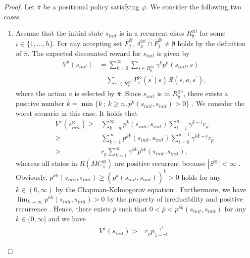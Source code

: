 \documentclass[letterpaper, 10 pt, conference]{ieeeconf}  %
\begin{document}
\begin{proof}
  Let $\bar{\pi}$ be a positional policy satisfying $\varphi$. We consider the following two cases.
  \begin{enumerate}
    \vspace{2mm}
    \item Assume that the initial state $s_{init}$ is in a recurrent class $R^{\otimes i}_{\bar{\pi}}$ for some $ i \in \{1,\ldots,h\} $.
    For any accepting set $\bar{F}^{\otimes}_j$, $\delta^{\otimes i}_{\bar{\pi}} \cap \bar{F}^{\otimes}_j \neq \emptyset$ holds by the definition of $\bar{\pi}$. The expected discounted reward for $s_{init}$ is given by
    \begin{align}
      V^{\bar{\pi}}(s_{init})
       &= \sum_{k=0}^{\infty} \sum_{s \in R^{\otimes i}_{\bar{\pi}}} \gamma^k p^k(s_{init}, s) \nonumber \\
       & \quad \sum_{s^{\prime} \in R^{\otimes i}_{\bar{\pi}}}  P^{\otimes}_{\bar{\pi}}(s^{\prime}\ |\ s) \mathcal{R}(s, a, s^{\prime}), \nonumber
    \end{align}
    where the action $a$ is selected by $\bar{\pi}$. Since $s_{init}$ is in $R^{\otimes i}_{\bar{\pi}}$, there exists a positive number $\bar{k} = \min \{ k\ ;\ k \geq n, p^{k}(s_{init}, s_{init}) > 0 \}$ \cite{ESS}. We consider the worst scenario in this case. It holds that
    \begin{align}
      V^{\bar{\pi}}(s^{\otimes}_{init})
       \geq & \sum_{k=n}^{\infty} p^{k}(s_{init}, s_{init}) \sum_{i=1}^{n} \gamma^{k-i} r_p \nonumber \\
       \geq & \sum_{k=1}^{\infty} p^{k \bar{k}}(s_{init}, s_{init}) \sum_{i=0}^{n-1} \gamma^{k \bar{k} - i} r_p \nonumber \\
       > & r_p \sum_{k=1}^{\infty} \gamma^{k \bar{k}} p^{k \bar{k}}(s_{init}, s_{init}), \nonumber
    \end{align}
whereas all states in $R(MC^{\otimes}_{\bar{\pi}})$ are positive recurrent because $|S^{\otimes}| < \infty$ \cite{ISP}. Obviously, $p^{k \bar{k}}(s_{init}, s_{init}) \geq (p^{\bar{k}}(s_{init}, s_{init}))^k > 0$ holds for any $k \in (0, \infty)$ by the Chapman-Kolmogorov equation \cite{ESS}. Furthermore, we have $\lim_{k \rightarrow \infty} p^{k \bar{k}}(s_{init}, s_{init}) > 0$ by the property of irreducibility and positive recurrence \cite{SM}. Hence, there exists $\bar{p}$ such that $0<\bar{p}<p^{k \bar{k}}(s_{init}, s_{init})$ for any $k \in (0, \infty]$ and we have
    \begin{align}
       V^{\bar{\pi}}(s_{init}) > & r_p \bar{p} \frac{\gamma^{\bar{k}}}{ 1 - \gamma^{\bar{k}} }. \nonumber
    \end{align}


\end{enumerate}
\end{proof}
\end{document}
